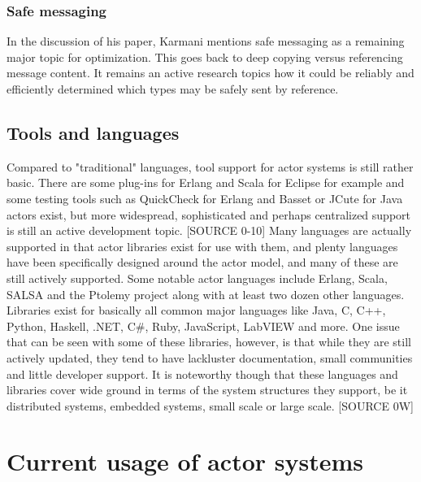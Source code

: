 \documentclass[A4]{article}
\begin{document}
\subsubsection{Safe messaging}
In the discussion of his paper, Karmani mentions safe messaging as a remaining major topic for optimization. This goes back to deep copying versus referencing message content. It remains an active research topics how it could be reliably and efficiently determined which types may be safely sent by reference.

\subsection{Tools and languages}
Compared to "traditional" languages, tool support for actor systems is still rather basic. There are some plug-ins for Erlang and Scala for Eclipse for example and some testing tools such as QuickCheck for Erlang and Basset or JCute for Java actors exist, but more widespread, sophisticated and perhaps centralized support is still an active development topic. [SOURCE 0-10]
Many languages are actually supported in that actor libraries exist for use with them, and plenty languages have been specifically designed around the actor model, and many of these are still actively supported. Some notable actor languages include Erlang, Scala, SALSA and the Ptolemy project along with at least two dozen other languages. Libraries exist for basically all common major languages like Java, C, C++, Python, Haskell, .NET, C\#, Ruby, JavaScript, LabVIEW and more. One issue that can be seen with some of these libraries, however, is that while they are still actively updated, they tend to have lackluster documentation, small communities and little developer support. It is noteworthy though that these languages and libraries cover wide ground in terms of the system structures they support, be it distributed systems, embedded systems, small scale or large scale. [SOURCE 0W]

\section{Current usage of actor systems}
\end{document}
